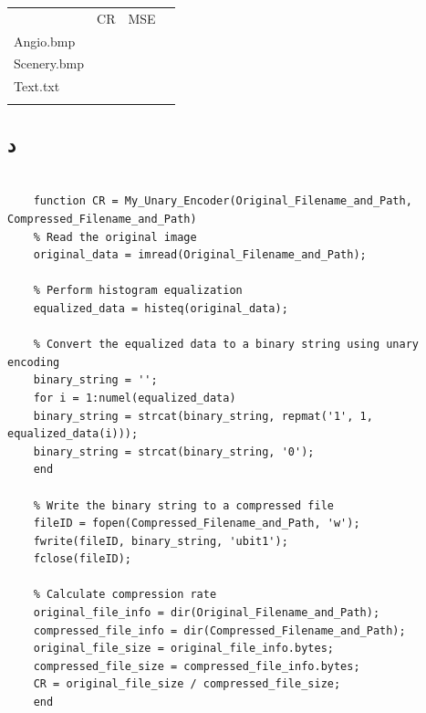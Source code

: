 \documentclass{article}
\begin{document}
	\begin{latin}



\begin{table}[H]
	\centering
	\begin{tabular}{|l|l|l|l} 
		\hhline{~--~}
		\multicolumn{1}{l|}{}                        & {\cellcolor[rgb]{0.957,0.745,0.745}}CR & {\cellcolor[rgb]{0.643,0.663,0.957}}MSE &   \\ 
		\hhline{|---~}
		{\cellcolor[rgb]{0.604,0.941,0.58}}Angio.bmp &                                        &                                         &   \\ 
		\hhline{|---~}
		{\cellcolor[rgb]{0.8,1,0.6}}Scenery.bmp      &                                        &                                         &   \\ 
		\hhline{|---~}
		{\cellcolor[rgb]{1,0.847,0.722}}Text.txt     &                                        &                                         &   \\
		\hhline{|---~}
	\end{tabular}
\end{table}

	\end{latin}
	
	\subsection{د}
	
\begin{latin}
	\begin{verbatim}
		
	function CR = My_Unary_Encoder(Original_Filename_and_Path, Compressed_Filename_and_Path)
	% Read the original image
	original_data = imread(Original_Filename_and_Path);
	
	% Perform histogram equalization
	equalized_data = histeq(original_data);
	
	% Convert the equalized data to a binary string using unary encoding
	binary_string = '';
	for i = 1:numel(equalized_data)
	binary_string = strcat(binary_string, repmat('1', 1, equalized_data(i)));
	binary_string = strcat(binary_string, '0');
	end
	
	% Write the binary string to a compressed file
	fileID = fopen(Compressed_Filename_and_Path, 'w');
	fwrite(fileID, binary_string, 'ubit1');
	fclose(fileID);
	
	% Calculate compression rate
	original_file_info = dir(Original_Filename_and_Path);
	compressed_file_info = dir(Compressed_Filename_and_Path);
	original_file_size = original_file_info.bytes;
	compressed_file_size = compressed_file_info.bytes;
	CR = original_file_size / compressed_file_size;
	end

\end{verbatim}
\end{latin}
	
\end{document}

